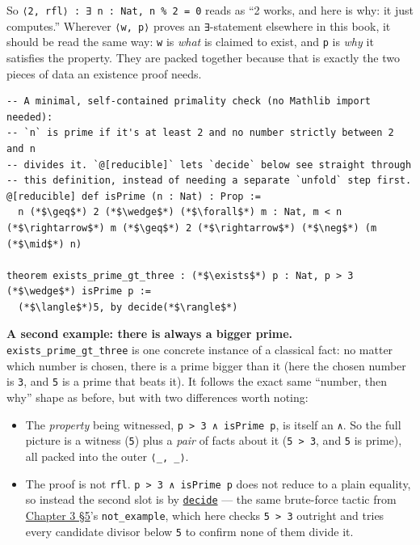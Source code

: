 So \texttt{⟨2, rfl⟩ : ∃ n : Nat, n \% 2 = 0} reads as ``2 works, and here is why: it just computes.'' Wherever \texttt{⟨w, p⟩} proves an \texttt{∃}-statement elsewhere in this book, it should be read the same way: \texttt{w} is \emph{what} is claimed to exist, and \texttt{p} is \emph{why} it satisfies the property. They are packed together because that is exactly the two pieces of data an existence proof needs.

\begin{lstlisting}
-- A minimal, self-contained primality check (no Mathlib import needed):
-- `n` is prime if it's at least 2 and no number strictly between 2 and n
-- divides it. `@[reducible]` lets `decide` below see straight through
-- this definition, instead of needing a separate `unfold` step first.
@[reducible] def isPrime (n : Nat) : Prop :=
  n (*$\geq$*) 2 (*$\wedge$*) (*$\forall$*) m : Nat, m < n (*$\rightarrow$*) m (*$\geq$*) 2 (*$\rightarrow$*) (*$\neg$*) (m (*$\mid$*) n)

theorem exists_prime_gt_three : (*$\exists$*) p : Nat, p > 3 (*$\wedge$*) isPrime p :=
  (*$\langle$*)5, by decide(*$\rangle$*)
\end{lstlisting}

\textbf{A second example: there is always a bigger prime.} \texttt{exists\_\allowbreak{}prime\_\allowbreak{}gt\_\allowbreak{}three} is one concrete instance of a classical fact: no matter which number is chosen, there is a prime bigger than it (here the chosen number is \texttt{3}, and \texttt{5} is a prime that beats it). It follows the exact same ``number, then why'' shape as before, but with two differences worth noting:

\begin{itemize}
\tightlist
\item
  The \emph{property} being witnessed, \texttt{p > 3 ∧ isPrime p}, is itself an \texttt{∧}. So the full picture is a witness (\texttt{5}) plus a \emph{pair} of facts about it (\texttt{5 > 3}, and \texttt{5} is prime), all packed into the outer \texttt{⟨\_\allowbreak{}, \_\allowbreak{}⟩}.
\item
  The proof is not \texttt{rfl}. \texttt{p > 3 ∧ isPrime p} does not reduce to a plain equality, so instead the second slot is by \href{https://lean-lang.org/doc/reference/latest/Tactic-Proofs/Tactic-Reference/}{\texttt{decide}} --- the same brute-force tactic from \hyperref[sec:03-propositions-and-proofs:05-and-or-not:1]{Chapter 3 §5}'s \texttt{not\_\allowbreak{}example}, which here checks \texttt{5 > 3} outright and tries every candidate divisor below \texttt{5} to confirm none of them divide it.
\end{itemize}

